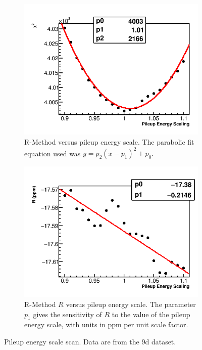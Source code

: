 \begin{figure}[h]
    \begin{subfigure}[t]{0.45\textwidth}
        \centering
        \includegraphics[width=\textwidth]{FullRatio_Chi2_Vs_PileupEnergyScaling_Canv}
        \caption{R-Method \chisq versus pileup energy scale. The parabolic fit equation used was $y = p_{2}(x - p_{1})^{2} + p_{0}.$}
    \end{subfigure}%
    \hspace{1cm}
    \begin{subfigure}[t]{0.45\textwidth}
        \centering
        \includegraphics[width=\textwidth]{FullRatio_R_Vs_PileupEnergyScaling_Canv}
        \caption{R-Method $R$ versus pileup energy scale. The parameter $p_{1}$ gives the sensitivity of $R$ to the value of the pileup energy scale, with units in ppm per unit scale factor.}
    \end{subfigure}
\caption[Pileup energy scale scan]{Pileup energy scale scan. Data are from the 9d dataset.}
\label{fig:PESscan}
\end{figure}



